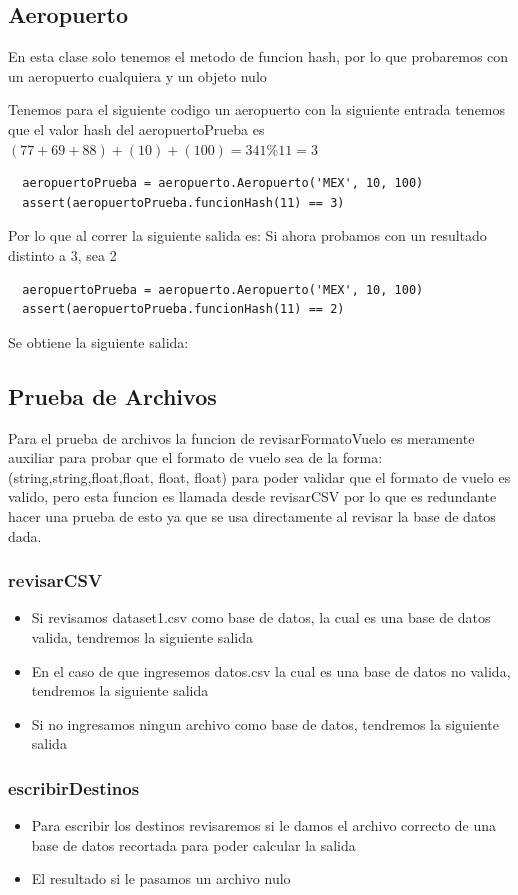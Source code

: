 \documentclass[12pt]{article}
\begin{document}
\subsection{Aeropuerto}
En esta clase solo tenemos el metodo de funcion hash, por lo que probaremos con un aeropuerto cualquiera y un objeto nulo

Tenemos para el siguiente codigo un aeropuerto con la siguiente entrada tenemos que el valor hash del aeropuertoPrueba es $(77+69+88)+(10)+(100)=341\%11=3$
\begin{verbatim}
  aeropuertoPrueba = aeropuerto.Aeropuerto('MEX', 10, 100)
  assert(aeropuertoPrueba.funcionHash(11) == 3)
\end{verbatim}
Por lo que al correr la siguiente salida es:
Si ahora probamos con un resultado distinto a 3, sea 2
\begin{verbatim}
  aeropuertoPrueba = aeropuerto.Aeropuerto('MEX', 10, 100)
  assert(aeropuertoPrueba.funcionHash(11) == 2)
\end{verbatim}
Se obtiene la siguiente salida:
\subsection{Prueba de Archivos}
Para el prueba de archivos la funcion de revisarFormatoVuelo es meramente auxiliar para probar que el formato de vuelo sea de la forma: (string,string,float,float, float, float) para poder validar que el formato de vuelo es valido, pero esta funcion es llamada desde revisarCSV por lo que es redundante hacer una prueba de esto ya que se usa directamente al revisar la base de datos dada.

\subsubsection{revisarCSV}
\begin{itemize}
\item Si revisamos dataset1.csv como base de datos, la cual es una base de datos valida, tendremos la siguiente salida
\item En el caso de que ingresemos datos.csv la cual es una base de datos no valida, tendremos la siguiente salida
\item Si no ingresamos ningun archivo como base de datos, tendremos la siguiente salida
\end{itemize}
\subsubsection{escribirDestinos}
\begin{itemize}
\item Para escribir los destinos revisaremos si le damos el archivo correcto de una base de datos recortada para poder calcular la salida
\item El resultado si le pasamos un archivo nulo
\end{itemize}
\end{document}
